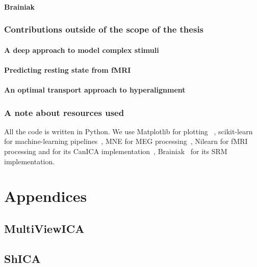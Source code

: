 \documentclass[ twoside,openright,titlepage,numbers=noenddot,%
                headinclude,footinclude,cleardoublepage=empty,abstract=on,
                BCOR=5mm,paper=a4,fontsize=11pt, 
                ]{scrreprt}
\begin{document}
\subsection{Brainiak}
\section{Contributions outside of the scope of the thesis}
\subsection{A deep approach to model complex stimuli}
\subsection{Predicting resting state from fMRI}
\subsection{An optimal transport approach to hyperalignment}
\section{A note about resources used}
All the code is written in Python.
We use Matplotlib for plotting~\cite{hunter2007matplotlib} , scikit-learn for
machine-learning pipelines~\cite{pedregosa2011scikit}, MNE for MEG
processing~\cite{gramfort2013meg}, Nilearn for fMRI processing and for its CanICA implementation~\cite{abraham2014machine}, Brainiak~\cite{kumar2020brainiak} for its SRM implementation. 
% 




\cleardoublepage

\appendix
\part{Appendices}
\chapter{MultiViewICA}

\chapter{ShICA}


\end{document}
